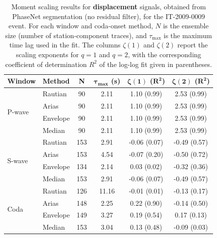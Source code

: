 \begin{table}[H]
\centering
\small
\begin{tabular}{llcccc}
\toprule
\textbf{Window} & \textbf{Method} & \textbf{N} & $\bm{\tau_{\max}}$ \textbf{(s)} & $\bm{\zeta(1)}$ \textbf{(}$\bm{R^2}$\textbf{)} & $\bm{\zeta(2)}$ \textbf{(}$\bm{R^2}$\textbf{)} \\
\midrule
\multirow{4}{*}{P-wave}
& Rautian & 90 & 2.11 & 1.10 (0.99) & 2.53 (0.99) \\
& Arias & 90 & 2.11 & 1.10 (0.99) & 2.53 (0.99) \\
& Envelope & 90 & 2.11 & 1.10 (0.99) & 2.53 (0.99) \\
& Median & 90 & 2.11 & 1.10 (0.99) & 2.53 (0.99) \\
\midrule
\multirow{4}{*}{S-wave}
& Rautian & 153 & 2.91 & -0.06 (0.07) & -0.49 (0.57) \\
& Arias & 153 & 4.54 & -0.07 (0.20) & -0.50 (0.72) \\
& Envelope & 134 & 2.14 & 0.03 (0.02) & -0.32 (0.36) \\
& Median & 153 & 2.91 & -0.06 (0.07) & -0.49 (0.57) \\
\midrule
\multirow{4}{*}{Coda}
& Rautian & 126 & 11.16 & -0.01 (0.01) & -0.13 (0.17) \\
& Arias & 148 & 2.25 & 0.22 (0.90) & -0.14 (0.50) \\
& Envelope & 149 & 3.27 & 0.19 (0.54) & 0.17 (0.13) \\
& Median & 153 & 3.04 & 0.13 (0.48) & -0.09 (0.03) \\
\bottomrule
\end{tabular}
\caption{Moment scaling results for \textbf{displacement} signals, obtained from PhaseNet segmentation (no residual filter), for the IT-2009-0009 event. For each window and coda-onset method, $N$ is the ensemble size (number of station-component traces), and $\tau_{\max}$ is the maximum time lag used in the fit. The columns $\zeta(1)$ and $\zeta(2)$ report the scaling exponents for $q=1$ and $q=2$, with the corresponding coefficient of determination $R^2$ of the log-log fit given in parentheses.}
\label{tab:phasenet_scaling_disp_nothresh_laquila}
\end{table}